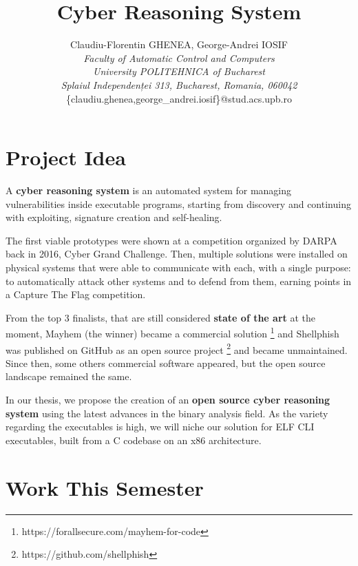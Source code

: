 \documentclass[12pt,a4paper,english,onecolumn]{IEEEtran}
\begin{document}
\title{Cyber Reasoning System}

\author{Claudiu-Florentin GHENEA, George-Andrei IOSIF\\
\emph{Faculty of Automatic Control and Computers \\ University POLITEHNICA of Bucharest \\ Splaiul Independenței 313, Bucharest, Romania, 060042}\\
\{claudiu.ghenea,george\_andrei.iosif\}@stud.acs.upb.ro}


\maketitle

\section{Project Idea}

A \textbf{cyber reasoning system} is an automated system for managing vulnerabilities inside executable programs, starting from discovery and continuing with exploiting, signature creation and self-healing.

The first viable prototypes were shown at a competition organized by DARPA back in 2016, Cyber Grand Challenge. Then, multiple solutions were installed on physical systems that were able to communicate with each, with a single purpose: to automatically attack other systems and to defend from them, earning points in a Capture The Flag competition.

From the top 3 finalists, that are still considered \textbf{state of the art} at the moment, Mayhem (the winner) became a commercial solution \footnote{https://forallsecure.com/mayhem-for-code} and Shellphish was published on GitHub as an open source project \footnote{https://github.com/shellphish} and became unmaintained. Since then, some others commercial software appeared, but the open source landscape remained the same.

In our thesis, we propose the creation of an \textbf{open source cyber reasoning system} using the latest advances in the binary analysis field. As the variety regarding the executables is high, we will niche our solution for ELF CLI executables, built from a C codebase on an x86 architecture.

\section{Work This Semester}
\end{document}

